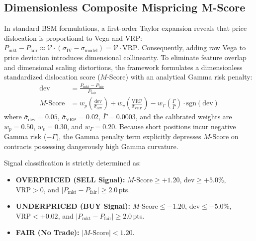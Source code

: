\documentclass[journal]{IEEEtran}
\begin{document}
\subsection{Dimensionless Composite Mispricing M-Score}
In standard BSM formulations, a first-order Taylor expansion reveals that price dislocation is proportional to Vega and VRP: $P_{\mathrm{mkt}} - P_{\mathrm{fair}} \approx \mathcal{V} \cdot (\sigma_{\mathrm{IV}} - \sigma_{\mathrm{model}}) = \mathcal{V} \cdot \mathrm{VRP}$. Consequently, adding raw Vega to price deviation introduces dimensional collinearity. To eliminate feature overlap and dimensional scaling distortions, the framework formulates a dimensionless standardized dislocation score ($M$-Score) with an analytical Gamma risk penalty:
\begin{equation}
\begin{aligned}
\mathrm{dev} &= \frac{P_{\mathrm{mkt}} - P_{\mathrm{fair}}}{P_{\mathrm{fair}}} \\
M\text{-Score} &= w_p \left( \frac{\mathrm{dev}}{\bar{\sigma}_{\mathrm{dev}}} \right) + w_v \left( \frac{\mathrm{VRP}}{\bar{\sigma}_{\mathrm{VRP}}} \right) - w_{\Gamma} \left( \frac{\Gamma}{\bar{\Gamma}} \right) \cdot \mathrm{sgn}(\mathrm{dev})
\end{aligned}
\end{equation}
where $\bar{\sigma}_{\mathrm{dev}} = 0.05$, $\bar{\sigma}_{\mathrm{VRP}} = 0.02$, $\bar{\Gamma} = 0.0003$, and the calibrated weights are $w_p = 0.50$, $w_v = 0.30$, and $w_{\Gamma} = 0.20$. Because short positions incur negative Gamma risk ($-\Gamma$), the Gamma penalty term explicitly depresses $M$-Score on contracts possessing dangerously high Gamma curvature.

Signal classification is strictly determined as:
\begin{itemize}
    \item \textbf{OVERPRICED (SELL Signal):} $M\text{-Score} \ge +1.20$, $\mathrm{dev} \ge +5.0\%$, $\mathrm{VRP} > 0$, and $|P_{\mathrm{mkt}} - P_{\mathrm{fair}}| \ge 2.0$\,pts.
    \item \textbf{UNDERPRICED (BUY Signal):} $M\text{-Score} \le -1.20$, $\mathrm{dev} \le -5.0\%$, $\mathrm{VRP} < +0.02$, and $|P_{\mathrm{mkt}} - P_{\mathrm{fair}}| \ge 2.0$\,pts.
    \item \textbf{FAIR (No Trade):} $|M\text{-Score}| < 1.20$.
\end{itemize}
\end{document}
